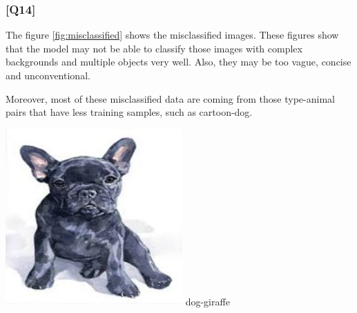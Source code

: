 \documentclass{article}
\begin{document}
\subsubsection*{[Q14]}

The figure \ref{fig:misclassified} shows the misclassified images.
These figures show that the model may not be able to classify those images with complex backgrounds and multiple objects very well.
Also, they may be too vague, concise and unconventional.

Moreover, most of these misclassified data are coming from those type-animal pairs that have less training samples, such as cartoon-dog.

\begin{center}
    \noindent 
    \begin{minipage}{0.142\textwidth}
        \includegraphics[width=\linewidth]{./pic/misclassified_r0_p2_2723.jpg}
        dog-giraffe
    \end{minipage}%
    \begin{minipage}{0.142\textwidth}

\end{minipage}
\end{center}
\end{document}
